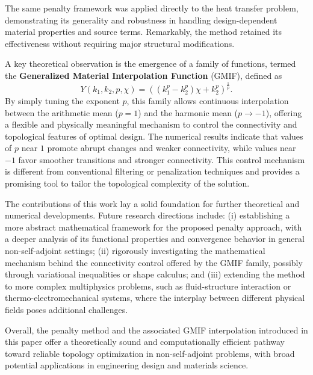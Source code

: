 \documentclass{amsart}
\begin{document}
The same penalty framework was applied directly to the heat transfer problem, demonstrating its generality and robustness in handling design-dependent material properties and source terms. Remarkably, the method retained its effectiveness without requiring major structural modifications.

A key theoretical observation is the emergence of a family of functions, termed the \textbf{Generalized Material Interpolation Function} (GMIF), defined as
\begin{equation}
    Y(k_1,k_2,p,\chi)=\left((k_1^p-k_2^p)\chi+k_2^p\right)^{\frac{1}{p}}.
\end{equation}
By simply tuning the exponent $p$, this family allows continuous interpolation between the arithmetic mean ($p=1$) and the harmonic mean ($p\to -1$), offering a flexible and physically meaningful mechanism to control the connectivity and topological features of optimal design. The numerical results indicate that values of $p$ near $1$ promote abrupt changes and weaker connectivity, while values near $-1$ favor smoother transitions and stronger connectivity. This control mechanism is different from conventional filtering or penalization techniques and provides a promising tool to tailor the topological complexity of the solution.

The contributions of this work lay a solid foundation for further theoretical and numerical developments. Future research directions include: (i) establishing a more abstract mathematical framework for the proposed penalty approach, with a deeper analysis of its functional properties and convergence behavior in general non-self-adjoint settings; (ii) rigorously investigating the mathematical mechanism behind the connectivity control offered by the GMIF family, possibly through variational inequalities or shape calculus; and (iii) extending the method to more complex multiphysics problems, such as fluid-structure interaction or thermo-electromechanical systems, where the interplay between different physical fields poses additional challenges.

Overall, the penalty method and the associated GMIF interpolation introduced in this paper offer a theoretically sound and computationally efficient pathway toward reliable topology optimization in non-self-adjoint problems, with broad potential applications in engineering design and materials science.
\printbibliography 
\end{document}
